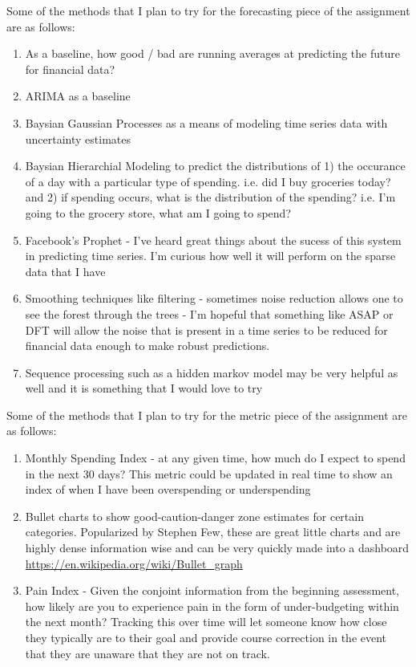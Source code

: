 \documentclass[11pt,a4paper]{article}
\begin{document}
Some of the methods that I plan to try for the forecasting piece of the assignment are as follows:
\begin{enumerate}
	\item As a baseline, how good / bad are running averages at predicting the future for financial data?
	\item ARIMA as a baseline
	\item Baysian Gaussian Processes as a means of modeling time series data with uncertainty estimates
	\item Baysian Hierarchial Modeling to predict the distributions of 1) the occurance of a day with a particular type of spending. i.e. did I buy groceries today? and 2) if spending occurs, what is the distribution of the spending? i.e. I'm going to the grocery store, what am I going to spend?
	\item Facebook's Prophet - I've heard great things about the sucess of this system in predicting time series. I'm curious how well it will perform on the sparse data that I have
	\item Smoothing techniques like filtering - sometimes noise reduction allows one to see the forest through the trees - I'm hopeful that something like ASAP or DFT will allow the noise that is present in a time series to be reduced for financial data enough to make robust predictions. 
	\item Sequence processing such as a hidden markov model may be very helpful as well and it is something that I would love to try
\end{enumerate}


Some of the methods that I plan to try for the metric piece of the assignment are as follows:
\begin{enumerate}
	\item Monthly Spending Index - at any given time, how much do I expect to spend in the next 30 days? This metric could be updated in real time to show an index of when I have been overspending or underspending
	\item Bullet charts to show good-caution-danger zone estimates for certain categories. Popularized by Stephen Few, these are great little charts and are highly dense information wise and can be very quickly made into a dashboard {\color{blue} \url{https://en.wikipedia.org/wiki/Bullet_graph}}
	\item Pain Index - Given the conjoint information from the beginning assessment, how likely are you to experience pain in the form of under-budgeting within the next month? Tracking this over time will let someone know how close they typically are to their goal and provide course correction in the event that they are unaware that they are not on track. 
\end{enumerate}
\end{document}
